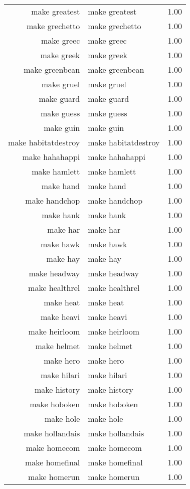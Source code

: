 \begin{table}[ht]
\begin{tabular}{rlr}
  make greatest & make greatest & 1.00 \\ 
  make grechetto & make grechetto & 1.00 \\ 
  make greec & make greec & 1.00 \\ 
  make greek & make greek & 1.00 \\ 
  make greenbean & make greenbean & 1.00 \\ 
  make gruel & make gruel & 1.00 \\ 
  make guard & make guard & 1.00 \\ 
  make guess & make guess & 1.00 \\ 
  make guin & make guin & 1.00 \\ 
  make habitatdestroy & make habitatdestroy & 1.00 \\ 
  make hahahappi & make hahahappi & 1.00 \\ 
  make hamlett & make hamlett & 1.00 \\ 
  make hand & make hand & 1.00 \\ 
  make handchop & make handchop & 1.00 \\ 
  make hank & make hank & 1.00 \\ 
  make har & make har & 1.00 \\ 
  make hawk & make hawk & 1.00 \\ 
  make hay & make hay & 1.00 \\ 
  make headway & make headway & 1.00 \\ 
  make healthrel & make healthrel & 1.00 \\ 
  make heat & make heat & 1.00 \\ 
  make heavi & make heavi & 1.00 \\ 
  make heirloom & make heirloom & 1.00 \\ 
  make helmet & make helmet & 1.00 \\ 
  make hero & make hero & 1.00 \\ 
  make hilari & make hilari & 1.00 \\ 
  make history & make history & 1.00 \\ 
  make hoboken & make hoboken & 1.00 \\ 
  make hole & make hole & 1.00 \\ 
  make hollandais & make hollandais & 1.00 \\ 
  make homecom & make homecom & 1.00 \\ 
  make homefinal & make homefinal & 1.00 \\ 
  make homerun & make homerun & 1.00 \\ 

\end{tabular}
\end{table}
